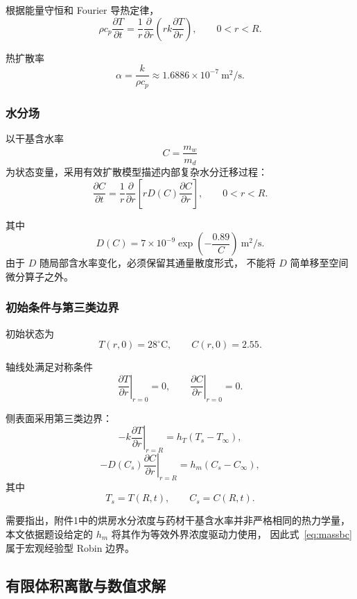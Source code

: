 \documentclass[UTF8,a4paper,11pt]{ctexart}
\begin{document}
根据能量守恒和 Fourier 导热定律，
\begin{equation}
\boxed{
\rho c_p\frac{\partial T}{\partial t}
=
\frac1r
\frac{\partial}{\partial r}
\left(
rk\frac{\partial T}{\partial r}
\right)
},
\qquad 0<r<R.
\label{eq:heat}
\end{equation}

热扩散率
\[
\alpha=\frac{k}{\rho c_p}
\approx1.6886\times10^{-7}\ \mathrm{m^2/s}.
\]

\subsubsection{水分场}

以干基含水率
\[
C=\frac{m_w}{m_d}
\]
为状态变量，采用有效扩散模型描述内部复杂水分迁移过程：
\begin{equation}
\boxed{
\frac{\partial C}{\partial t}
=
\frac1r
\frac{\partial}{\partial r}
\left[
rD(C)\frac{\partial C}{\partial r}
\right]
},
\qquad 0<r<R.
\label{eq:mass}
\end{equation}

其中
\[
D(C)=7\times10^{-9}\exp\left(-\frac{0.89}{C}\right)
\ \mathrm{m^2/s}.
\]
由于 $D$ 随局部含水率变化，必须保留其通量散度形式，
不能将 $D$ 简单移至空间微分算子之外。

\subsubsection{初始条件与第三类边界}

初始状态为
\[
T(r,0)=28^\circ\mathrm C,
\qquad
C(r,0)=2.55.
\]

轴线处满足对称条件
\[
\left.\frac{\partial T}{\partial r}\right|_{r=0}=0,
\qquad
\left.\frac{\partial C}{\partial r}\right|_{r=0}=0.
\]

侧表面采用第三类边界：
\begin{equation}
-k\left.\frac{\partial T}{\partial r}\right|_{r=R}
=
h_T\left(T_s-T_\infty\right),
\label{eq:heatbc}
\end{equation}
\begin{equation}
-D(C_s)\left.\frac{\partial C}{\partial r}\right|_{r=R}
=
h_m\left(C_s-C_\infty\right),
\label{eq:massbc}
\end{equation}
其中
\[
T_s=T(R,t),\qquad C_s=C(R,t).
\]

需要指出，附件1中的烘房水分浓度与药材干基含水率并非严格相同的热力学量，
本文依据题设给定的 $h_m$ 将其作为等效外界浓度驱动力使用，
因此式~\eqref{eq:massbc} 属于宏观经验型 Robin 边界。

\subsection{有限体积离散与数值求解}
\end{document}
